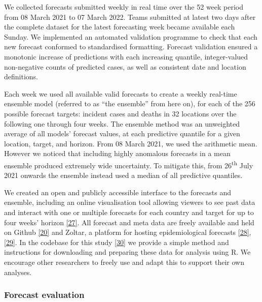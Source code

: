 \documentclass[
]{article}
\begin{document}
We collected forecasts submitted weekly in real time over the 52 week period from 08 March 2021 to 07 March 2022. Teams submitted at latest two days after the complete dataset for the latest forecasting week became available each Sunday. We implemented an automated validation programme to check that each new forecast conformed to standardised formatting. Forecast validation ensured a monotonic increase of predictions with each increasing quantile, integer-valued non-negative counts of predicted cases, as well as consistent date and location definitions.

Each week we used all available valid forecasts to create a weekly real-time ensemble model (referred to as ``the ensemble'' from here on), for each of the 256 possible forecast targets: incident cases and deaths in 32 locations over the following one through four weeks. The ensemble method was an unweighted average of all models' forecast values, at each predictive quantile for a given location, target, and horizon. From 08 March 2021, we used the arithmetic mean. However we noticed that including highly anomalous forecasts in a mean ensemble produced extremely wide uncertainty. To mitigate this, from 26\textsuperscript{th} July 2021 onwards the ensemble instead used a median of all predictive quantiles.

We created an open and publicly accessible interface to the forecasts and ensemble, including an online visualisation tool allowing viewers to see past data and interact with one or multiple forecasts for each country and target for up to four weeks' horizon \protect\hyperlink{ref-europeancovid-19forecasthubEuropeanCovid19Forecast}{{[}27{]}}. All forecast and meta data are freely available and held on Github \protect\hyperlink{ref-europeancovid-19forecasthubEuropeanCOVID19Forecast2021}{{[}20{]}} and Zoltar, a platform for hosting epidemiological forecasts \protect\hyperlink{ref-epiforecastsProjectECDCEuropean2021}{{[}28{]}}, \protect\hyperlink{ref-reichZoltarForecastArchive2021}{{[}29{]}}. In the codebase for this study \protect\hyperlink{ref-PredictivePerformanceMultimodel2022}{{[}30{]}} we provide a simple method and instructions for downloading and preparing these data for analysis using R. We encourage other researchers to freely use and adapt this to support their own analyses.

\hypertarget{forecast-evaluation}{%
\subsubsection{Forecast evaluation}\label{forecast-evaluation}}
\end{document}
